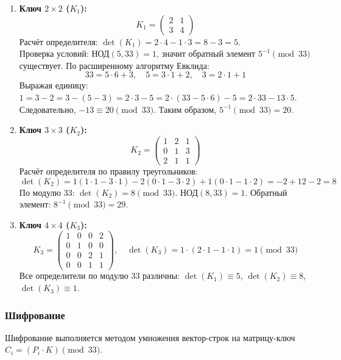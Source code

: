 \begin{enumerate}
    \item \textbf{Ключ $2\times2$ ($K_1$):}
    \[
    K_1 = \begin{pmatrix} 2 & 1 \\ 3 & 4 \end{pmatrix}
    \]
    Расчёт определителя: $\det(K_1) = 2 \cdot 4 - 1 \cdot 3 = 8 - 3 = 5$. \\
    Проверка условий: $\text{НОД}(5, 33) = 1$, значит обратный элемент $5^{-1} \pmod{33}$ существует. По расширенному алгоритму Евклида:
    \[
    33 = 5 \cdot 6 + 3, \quad 5 = 3 \cdot 1 + 2, \quad 3 = 2 \cdot 1 + 1
    \]
    Выражая единицу: $1 = 3 - 2 = 3 - (5 - 3) = 2 \cdot 3 - 5 = 2 \cdot (33 - 5 \cdot 6) - 5 = 2 \cdot 33 - 13 \cdot 5$. \\
    Следовательно, $-13 \equiv 20 \pmod{33}$. Таким образом, $5^{-1} \pmod{33} = 20$.

    \item \textbf{Ключ $3\times3$ ($K_2$):}
    \[
    K_2 = \begin{pmatrix} 1 & 2 & 1 \\ 0 & 1 & 3 \\ 2 & 1 & 1 \end{pmatrix}
    \]
    Расчёт определителя по правилу треугольников:
    \[
    \det(K_2) = 1(1 \cdot 1 - 3 \cdot 1) - 2(0 \cdot 1 - 3 \cdot 2) + 1(0 \cdot 1 - 1 \cdot 2) = -2 + 12 - 2 = 8
    \]
    По модулю 33: $\det(K_2) = 8 \pmod{33}$. $\text{НОД}(8, 33) = 1$. Обратный элемент: $8^{-1} \pmod{33} = 29$.

    \item \textbf{Ключ $4\times4$ ($K_3$):}
    \[
    K_3 = \begin{pmatrix} 1 & 0 & 0 & 2 \\ 0 & 1 & 0 & 0 \\ 0 & 0 & 2 & 1 \\ 0 & 0 & 1 & 1 \end{pmatrix}, \quad \det(K_3) = 1 \cdot (2 \cdot 1 - 1 \cdot 1) = 1 \pmod{33}
    \]
    Все определители по модулю 33 различны: $\det(K_1) \equiv 5$, $\det(K_2) \equiv 8$, $\det(K_3) \equiv 1$.
\end{enumerate}

\subsubsection{Шифрование}

Шифрование выполняется методом умножения вектор-строк на матрицу-ключ $C_i = (P_i \cdot K) \pmod{33}$.

